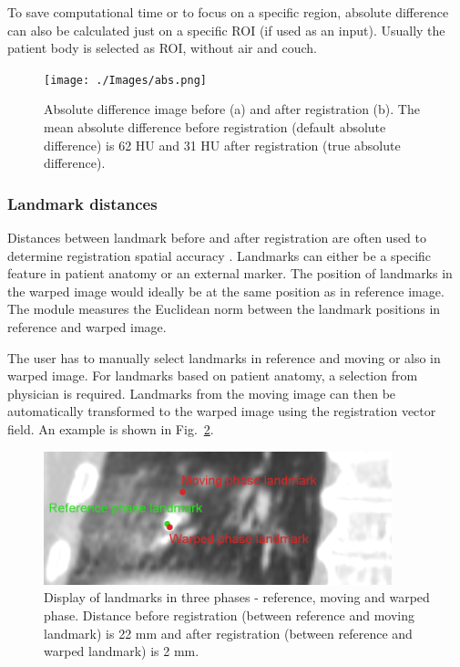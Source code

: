 \documentclass[type=dr, dr=rernat, accentcolor=tud7b,colorbacktitle, bigchapter, openright, twoside, 12pt ]{tudthesis}
\begin{document}
To save computational time or to focus on a specific region, absolute difference can also be calculated just on a specific ROI (if used as an input). Usually the patient body is selected as ROI, without air and couch.


\begin{figure}[H]
	\begin{center}		
		\texttt{[image: ./Images/abs.png]}
		\caption{Absolute difference image before (a) and after registration (b). The mean absolute difference before registration (default absolute difference) is 62 HU and 31 HU after registration (true absolute difference).}
		\label{absDiff}
	\end{center}
\end{figure}


\subsubsection{Landmark distances}

Distances between landmark before and after registration are often used to determine registration spatial accuracy \cite{Castillo2009}. 
Landmarks can either be a specific feature in patient anatomy or an external marker. The position of landmarks in the warped image would ideally 
be at the same position as in reference image. The module measures the Euclidean norm between the landmark positions in reference and warped image.

The user has to manually select landmarks in reference and moving or also in warped image. For landmarks based on patient anatomy, a selection from physician is required. 
Landmarks from the moving image can then be automatically transformed to the warped image using the registration vector field. An example is shown in Fig.~\ref{landmark}.

\begin{figure}[H]
\begin{center}
\includegraphics[width=0.9\textwidth]{./Images/landmark.png}
\caption{Display of landmarks in three phases - reference, moving and warped phase. Distance before registration (between reference and moving landmark) is 22 mm and after registration
(between reference and warped landmark) is 2 mm.}
\label{landmark}
\end{center}
\end{figure}
\end{document}
